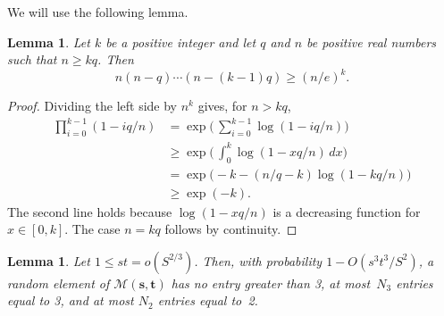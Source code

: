 \documentclass[12pt]{article}
\newtheorem{lemma}[theorem]{Lemma}
\numberwithin{equation}{section}
\def\M{{\mathcal{M}}}
\def\({\bigl(}   \def\){\bigr)}
\def\svec{{\boldsymbol{s}}}
\def\tvec{{\boldsymbol{t}}}
\def\Mst{{\M(\svec,\tvec)}}
\begin{document}
We will use the following lemma.

\begin{lemma}
\label{useful}
Let $k$ be a positive integer and let $q$ and $n$
be positive real numbers such that $n \ge kq$.
Then
\[ n(n-q)\cdots (n-(k-1)q)\geq (n/e)^k.\]
\end{lemma}

\begin{proof}
Dividing the left side by $n^k$ gives, for $n>kq$,
\begin{align*}
\prod_{i=0}^{k-1} (1-iq/n)
       &=   \exp\biggl(\, \sum_{i=0}^{k-1} \log(1-iq/n) \biggr)\\
       &\geq \exp\biggl(\, \int_{0}^k \log(1-xq/n) \, dx \biggr) \\
       &=   \exp\(-k - (n/q-k)\log(1-kq/n))\\
       &\geq \exp(-k).
\end{align*}
The second line holds because $\log(1-xq/n)$ is a 
decreasing function for $x\in[0,k]$.
The case $n=kq$ follows by continuity.
\end{proof}

\begin{lemma}\label{notmany23}
Let $1\leq st = o(S^{2/3})$. 
Then, with probability $1-O(s^3t^3/S^2)$, a random element
of $\Mst$ has no entry greater than 3, at most~$N_3$
entries equal to 3, and at most $N_2$ entries equal to~2.
\end{lemma}
\end{document}
